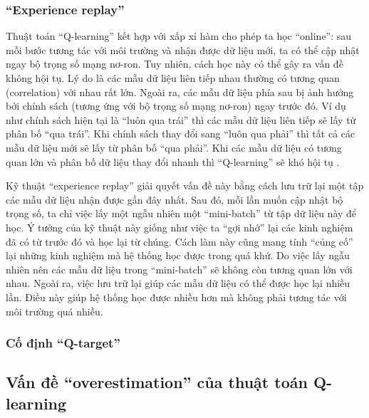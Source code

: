\subsubsection*{``Experience replay''}
	Thuật toán ``Q-learning'' kết hợp với xấp xỉ hàm cho phép ta học ``online'': sau mỗi bước tương tác với môi trường và nhận được dữ liệu mới, ta có thể cập nhật ngay bộ trọng số mạng nơ-ron.
	Tuy nhiên, cách học này có thể gây ra vấn đề không hội tụ.
	Lý do là các mẫu dữ liệu liên tiếp nhau thường có tương quan (correlation) với nhau rất lớn.
	Ngoài ra, các mẫu dữ liệu phía sau bị ảnh hưởng bởi chính sách (tương ứng với bộ trọng số mạng nơ-ron) ngay trước đó.
	Ví dụ như chính sách hiện tại là ``luôn qua trái'' thì các mẫu dữ liệu liên tiếp sẽ lấy từ phân bố ``qua trái''.
	Khi chính sách thay đổi sang ``luôn qua phải'' thì tất cả các mẫu dữ liệu mới sẽ lấy từ phân bố ``qua phải''.
	Khi các mẫu dữ liệu có tương quan lớn và phân bố dữ liệu thay đổi nhanh thì ``Q-learning'' sẽ khó hội tụ \cite{mnihdqn2015}.
	
	Kỹ thuật ``experience replay'' \cite{lin1993reinforcement} giải quyết vấn đề này bằng cách lưu trữ lại một tập các mẫu dữ liệu nhận được gần đây nhất.
	Sau đó, mỗi lần muốn cập nhật bộ trọng số, ta chỉ việc lấy một ngẫu nhiên một ``mini-batch'' từ tập dữ liệu này để học.
	Ý tưởng của kỹ thuật này giống như việc ta ``gợi nhớ'' lại các kinh nghiệm đã có từ trước đó và học lại từ chúng.
	Cách làm này cũng mang tính ``củng cố'' lại những kinh nghiệm mà hệ thống học được trong quá khứ.
	Do việc lấy ngẫu nhiên nên các mẫu dữ liệu trong ``mini-batch'' sẽ không còn tương quan lớn với nhau.
	Ngoài ra, việc lưu trữ lại giúp các mẫu dữ liệu có thể được học lại nhiều lần.
	Điều này giúp hệ thống học được nhiều hơn mà không phải tương tác với môi trường quá nhiều.
	
\subsubsection*{Cố định ``Q-target''}

\subsection{Vấn đề ``overestimation'' của thuật toán Q-learning}






